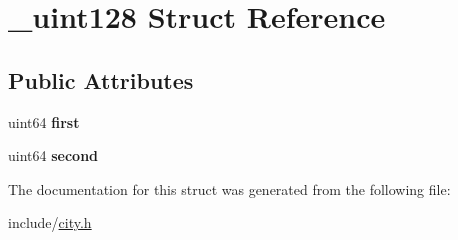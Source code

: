 \hypertarget{struct__uint128}{\section{\+\_\+uint128 Struct Reference}
\label{struct__uint128}
}
\subsection*{Public Attributes}
\begin{DoxyCompactItemize}
\item 
\hypertarget{struct__uint128_a3dbe253442b64a2b687a6dec18a4228a}{uint64 {\bfseries first}}\label{struct__uint128_a3dbe253442b64a2b687a6dec18a4228a}

\item 
\hypertarget{struct__uint128_af6bc6891fe0f6485d2e93c1f293c0af5}{uint64 {\bfseries second}}\label{struct__uint128_af6bc6891fe0f6485d2e93c1f293c0af5}

\end{DoxyCompactItemize}


The documentation for this struct was generated from the following file\+:\begin{DoxyCompactItemize}
\item 
include/\hyperlink{city_8h}{city.\+h}\end{DoxyCompactItemize}

